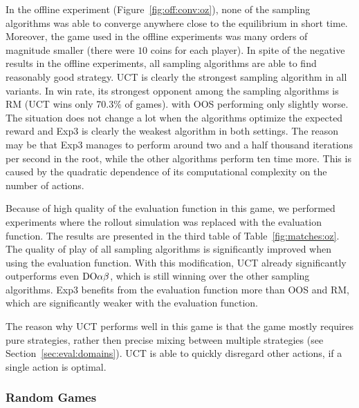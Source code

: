 In the offline experiment (Figure~\ref{fig:off:conv:oz}), none of the sampling algorithms was able to converge anywhere close to the equilibrium in short time. Moreover, the game used in the offline experiments was many orders of magnitude smaller (there were $10$ coins for each player).
In spite of the negative results in the offline experiments, all sampling algorithms are able to find reasonably good strategy.
UCT is clearly the strongest sampling algorithm in all variants. 
In win rate, its strongest opponent among the sampling algorithms is RM (UCT wins only 70.3\% of games). 
with OOS performing only slightly worse.
The situation does not change a lot when the algorithms optimize the expected reward and Exp3 is clearly the weakest algorithm in both settings. The reason may be that Exp3 manages to perform around two and a half thousand iterations per second in the root, while the other algorithms perform ten time more. This is caused by the quadratic dependence of its computational complexity on the number of actions.

Because of high quality of the evaluation function in this game, we performed experiments where the rollout simulation was replaced with the evaluation function. 
The results are presented in the third table of Table~\ref{fig:matches:oz}.
The quality of play of all sampling algorithms is significantly improved when using the evaluation function.
With this modification, UCT already significantly outperforms even $\textrm{DO}\alpha\beta$, which is still winning over the other sampling algorithms.
Exp3 benefits from the evaluation function more than OOS and RM, which are significantly weaker with the evaluation function.

The reason why UCT performs well in this game is that the game mostly requires pure strategies, rather then precise mixing between multiple strategies (see Section~\ref{sec:eval:domains}). UCT is able to quickly disregard other actions, if a single action is optimal.

\subsubsection{Random Games}

